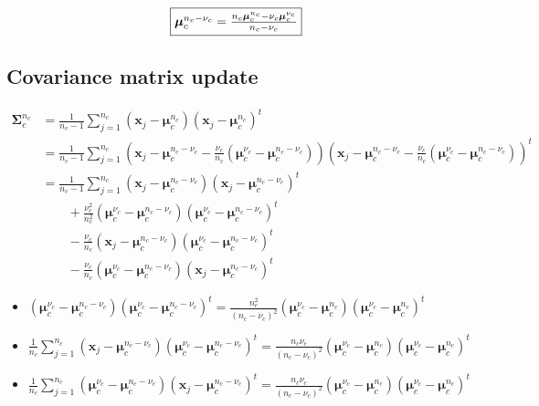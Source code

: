 \documentclass[a4paper,11pt,DIV=16]{scrartcl}
\begin{document}
        \begin{equation}
            \fbox{$\boldsymbol{\mu}_c^{n_c-\nu_c} = \frac{n_c \boldsymbol{\mu}_c^{n_c} - \nu_c \boldsymbol{\mu}_c^{\nu_c}}{n_c - \nu_c}$}
        \end{equation}

    \subsection{Covariance matrix update}
        \begin{align*}
            \boldsymbol{\Sigma}_c^{n_c} &= \frac{1}{n_c - 1} \sum_{j = 1}^{n_c} (\mathbf{x}_j - \boldsymbol{\mu}_c^{n_c}) (\mathbf{x}_j - \boldsymbol{\mu}_c^{n_c})^t \\
                           &= \frac{1}{n_c - 1} \sum_{j = 1}^{n_c} (\mathbf{x}_j - \boldsymbol{\mu}_c^{n_c-\nu_c} - \frac{\nu_c}{n_c} (\boldsymbol{\mu}_c^{\nu_c} - \boldsymbol{\mu}_c^{n_c-\nu_c})) (\mathbf{x}_j - \boldsymbol{\mu}_c^{n_c-\nu_c} - \frac{\nu_c}{n_c} (\boldsymbol{\mu}_c^{\nu_c} - \boldsymbol{\mu}_c^{n_c-\nu_c}))^t \\
                           &= \frac{1}{n_c - 1} \sum_{j = 1}^{n_c} (\mathbf{x}_j - \boldsymbol{\mu}_c^{n_c-\nu_c}) (\mathbf{x}_j - \boldsymbol{\mu}_c^{n_c-\nu_c})^t \\
                                                                 &\qquad + \frac{\nu_c^2}{n_c^2} (\boldsymbol{\mu}_c^{\nu_c}-\boldsymbol{\mu}_c^{n_c-\nu_c})(\boldsymbol{\mu}_c^{\nu_c}-\boldsymbol{\mu}_c^{n_c-\nu_c})^t \\
                                                                 &\qquad - \frac{\nu_c}{n_c} (\mathbf{x}_j-\boldsymbol{\mu}_c^{n_c-\nu_c})(\boldsymbol{\mu}_c^{\nu_c}-\boldsymbol{\mu}_c^{n_c-\nu_c})^t \\
                                                                 &\qquad - \frac{\nu_c}{n_c} (\boldsymbol{\mu}_c^{\nu_c}-\boldsymbol{\mu}_c^{n_c-\nu_c})(\mathbf{x}_j-\boldsymbol{\mu}_c^{n_c-\nu_c})^t
        \end{align*}

        \begin{itemize}
            \item $(\boldsymbol{\mu}_c^{\nu_c}-\boldsymbol{\mu}_c^{n_c-\nu_c})(\boldsymbol{\mu}_c^{\nu_c}-\boldsymbol{\mu}_c^{n_c-\nu_c})^t = \frac{n_c^2}{(n_c-\nu_c)^2} (\boldsymbol{\mu}_c^{\nu_c}-\boldsymbol{\mu}_c^{n_c})(\boldsymbol{\mu}_c^{\nu_c}-\boldsymbol{\mu}_c^{n_c})^t$
            \item $\frac{1}{n_c} \sum_{j = 1}^{n_c} (\mathbf{x}_j-\boldsymbol{\mu}_c^{n_c-\nu_c})(\boldsymbol{\mu}_c^{\nu_c}-\boldsymbol{\mu}_c^{n_c-\nu_c})^t = \frac{n_c \nu_c}{(n_c-\nu_c)^2} (\boldsymbol{\mu}_c^{\nu_c}-\boldsymbol{\mu}_c^{n_c})(\boldsymbol{\mu}_c^{\nu_c}-\boldsymbol{\mu}_c^{n_c})^t$
            \item $\frac{1}{n_c} \sum_{j = 1}^{n_c} (\boldsymbol{\mu}_c^{\nu_c}-\boldsymbol{\mu}_c^{n_c-\nu_c})(\mathbf{x}_j-\boldsymbol{\mu}_c^{n_c-\nu_c})^t = \frac{n_c \nu_c}{(n_c-\nu_c)^2} (\boldsymbol{\mu}_c^{\nu_c}-\boldsymbol{\mu}_c^{n_c})(\boldsymbol{\mu}_c^{\nu_c}-\boldsymbol{\mu}_c^{n_c})^t$
        \end{itemize}
\end{document}
